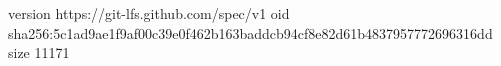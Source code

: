 version https://git-lfs.github.com/spec/v1
oid sha256:5c1ad9ae1f9af00c39e0f462b163baddcb94cf8e82d61b4837957772696316dd
size 11171
